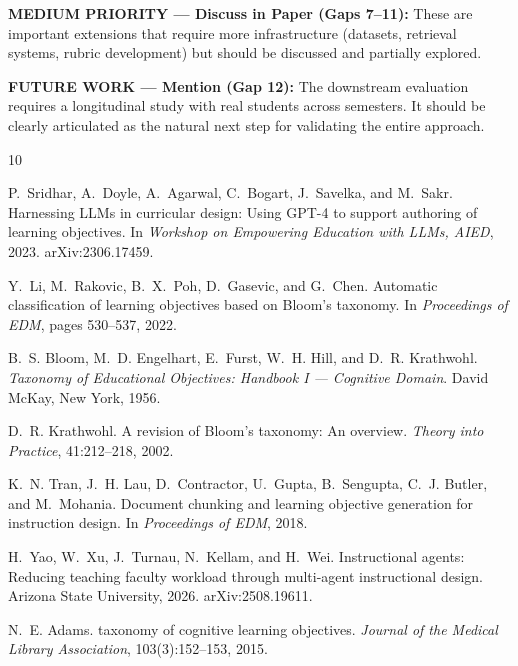 \documentclass[11pt,a4paper]{article}
\begin{document}
\begin{notebox}
\textbf{MEDIUM PRIORITY --- Discuss in Paper (Gaps 7--11):} These are important extensions that require more infrastructure (datasets, retrieval systems, rubric development) but should be discussed and partially explored.
\end{notebox}

\begin{warnbox}
\textbf{FUTURE WORK --- Mention (Gap 12):} The downstream evaluation requires a longitudinal study with real students across semesters. It should be clearly articulated as the natural next step for validating the entire approach.
\end{warnbox}



\begin{thebibliography}{10}

P.~Sridhar, A.~Doyle, A.~Agarwal, C.~Bogart, J.~Savelka, and M.~Sakr.
\newblock Harnessing {LLMs} in curricular design: Using {GPT-4} to support authoring of learning objectives.
\newblock In \textit{Workshop on Empowering Education with LLMs, AIED}, 2023.
\newblock arXiv:2306.17459.

Y.~Li, M.~Rakovic, B.~X.~Poh, D.~Gasevic, and G.~Chen.
\newblock Automatic classification of learning objectives based on {Bloom's} taxonomy.
\newblock In \textit{Proceedings of EDM}, pages 530--537, 2022.

B.~S. Bloom, M.~D. Engelhart, E.~Furst, W.~H. Hill, and D.~R. Krathwohl.
\newblock \textit{Taxonomy of Educational Objectives: Handbook {I} --- Cognitive Domain}.
\newblock David McKay, New York, 1956.

D.~R. Krathwohl.
\newblock A revision of {Bloom's} taxonomy: An overview.
\newblock \textit{Theory into Practice}, 41:212--218, 2002.

K.~N. Tran, J.~H. Lau, D.~Contractor, U.~Gupta, B.~Sengupta, C.~J. Butler, and M.~Mohania.
\newblock Document chunking and learning objective generation for instruction design.
\newblock In \textit{Proceedings of EDM}, 2018.

H.~Yao, W.~Xu, J.~Turnau, N.~Kellam, and H.~Wei.
\newblock Instructional agents: Reducing teaching faculty workload through multi-agent instructional design.
\newblock Arizona State University, 2026.
\newblock arXiv:2508.19611.

N.~E. Adams.
 taxonomy of cognitive learning objectives.
\newblock \textit{Journal of the Medical Library Association}, 103(3):152--153, 2015.

\end{thebibliography}
\end{document}
